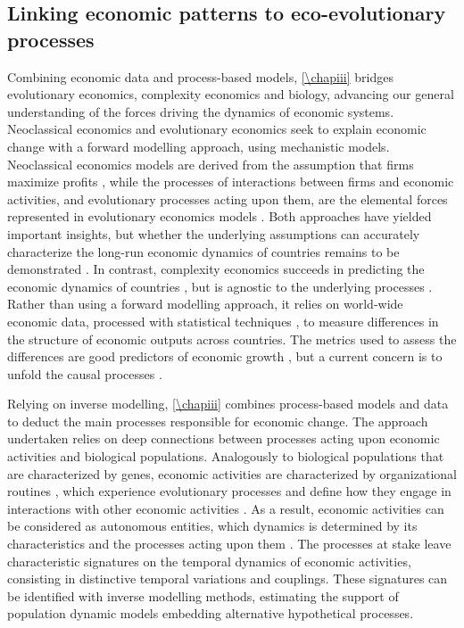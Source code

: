 \subsection{Linking economic patterns to eco-evolutionary processes}

Combining economic data and process-based models, \cref{\chapiii} bridges evolutionary economics, complexity economics and biology, advancing our general understanding of the forces driving the dynamics of economic systems.
% 
Neoclassical economics and evolutionary economics seek to explain economic change with a forward modelling approach, using mechanistic models.
% 
Neoclassical economics models are derived from the assumption that firms maximize profits \citep{Romer1986}, while the processes of interactions between firms and economic activities, and evolutionary processes acting upon them, are the elemental forces represented in evolutionary economics models \citep{Metcalfe2006}. Both approaches have yielded important insights, but whether the underlying assumptions can accurately characterize the long-run economic dynamics of countries remains to be demonstrated \citep{Hodgson2019}.
% 
In contrast, complexity economics succeeds in predicting the economic dynamics of countries \citep{Hidalgo2021}, but is agnostic to the underlying processes \citep{Hidalgo2021}. Rather than using a forward modelling approach, it relies on world-wide economic data, processed with statistical techniques \citep{Mealy2019}, to measure differences in the structure of economic outputs across countries. The metrics used to assess the differences are good predictors of economic growth \citep{Tacchella2018}, but a current concern is to unfold the causal processes \citep{Hidalgo2021}.

Relying on inverse modelling, \cref{\chapiii} combines process-based models and data to deduct the main processes responsible for economic change.
% 
The approach undertaken relies on deep connections between processes acting upon economic activities and biological populations.
% 
Analogously to biological populations that are characterized by genes, economic activities are characterized by organizational routines \citep{nelson1985evolutionary}, which experience evolutionary processes and define how they engage in interactions with other economic activities \citep{nelson1985evolutionary}.
% 
As a result, economic activities can be considered as autonomous entities, which dynamics is determined by its characteristics and the processes acting upon them \citep{Boschma2005a}.
% 
The processes at stake leave characteristic signatures on the temporal dynamics of economic activities, consisting in distinctive temporal variations and couplings.
% 
These signatures can be identified with inverse modelling methods, estimating the support of population dynamic models embedding alternative hypothetical processes.

